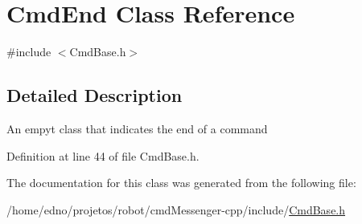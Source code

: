 \hypertarget{class_cmd_end}{\section{Cmd\+End Class Reference}
\label{class_cmd_end}
}


{\ttfamily \#include $<$Cmd\+Base.\+h$>$}



\subsection{Detailed Description}
An empyt class that indicates the end of a command 

Definition at line 44 of file Cmd\+Base.\+h.



The documentation for this class was generated from the following file\+:\begin{DoxyCompactItemize}
\item 
/home/edno/projetos/robot/cmd\+Messenger-\/cpp/include/\hyperlink{_cmd_base_8h}{Cmd\+Base.\+h}\end{DoxyCompactItemize}

